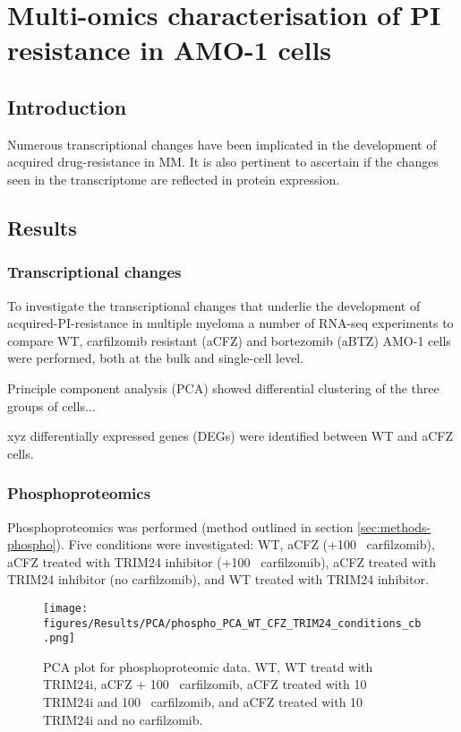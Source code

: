 \chapter{\label{ch:5-results}Multi-omics characterisation of PI resistance in AMO-1 cells}



\section{Introduction}\label{sec:omics-intro}
Numerous transcriptional changes have been implicated in the development of acquired drug-resistance in MM.
It is also pertinent to ascertain if the changes seen in the transcriptome are reflected in protein expression.

\section{Results}\label{sec:omics-results}

\subsection{Transcriptional changes}\label{sec:omics-transcriptomics}
To investigate the transcriptional changes that underlie the development of acquired-PI-resistance in multiple myeloma a number of RNA-seq experiments to compare WT, carfilzomib resistant (aCFZ) and bortezomib (aBTZ) AMO-1 cells were performed, both at the bulk and single-cell level.

Principle component analysis (PCA) showed differential clustering of the three groups of cells...

xyz differentially expressed genes (DEGs) were identified between WT and aCFZ cells.


\subsection{Phosphoproteomics}\label{subsec:omics-phospho}
Phosphoproteomics was performed (method outlined in section \ref{sec:methods-phospho}).
Five conditions were investigated: WT, aCFZ (+100\si{\nano\Molar} carfilzomib), aCFZ treated with TRIM24 inhibitor (+100\si{\nano\Molar} carfilzomib), aCFZ treated with TRIM24 inhibitor (no carfilzomib), and WT treated with TRIM24 inhibitor.

\begin{figure}[htb]
\centering
\texttt{[image: figures/Results/PCA/phospho\_PCA\_WT\_CFZ\_TRIM24\_conditions\_cb.png]}
\caption[Phosphoproteomics PCA]{PCA plot for phosphoproteomic data.
WT, WT treatd with TRIM24i, aCFZ + 100\si{\nano\Molar} carfilzomib, aCFZ treated with 10\si{\mu\Molar} TRIM24i and 100\si{\nano\Molar} carfilzomib, and aCFZ treated with 10\si{\micro\Molar} TRIM24i and no carfilzomib.}
\label{fig:phospho_PCA}
\end{figure}


